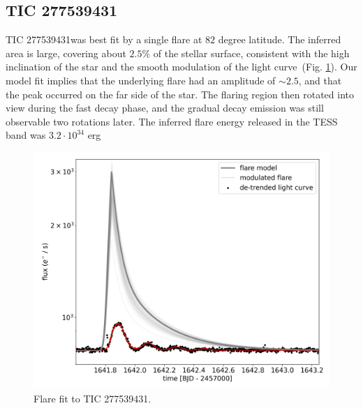 \documentclass[fleqn,usenatbib,letters]{mnras}%
\newcommand{\FA}{TIC 277539431} %
\begin{document}
\subsection{\FA}
\FA was best fit by a single flare at $82$ degree latitude. The inferred area is large, covering about $2.5\%$ of the stellar surface, consistent with the high inclination of the star and the smooth modulation of the light curve~(Fig. \ref{fig:fit\FA}). Our model fit implies that the underlying flare had an amplitude of $\sim 2.5$, and that the peak occurred on the far side of the star. The flaring region then rotated into view during the fast decay phase, and the gradual decay emission was still observable two rotations later. The inferred flare energy released in the TESS band was $3.2\cdot 10^{34}$ erg 

\begin{figure}
	\includegraphics[width=\columnwidth]{figures/08_07_2020_11_48_TIC277539431_flarefit_50retrievals.png}
    \caption{Flare fit to \FA.}
    \label{fig:fit\FA}
\end{figure}
\end{document}
